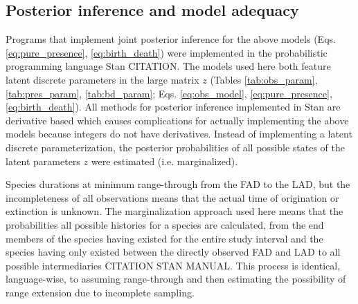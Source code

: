\documentclass[12pt,letterpaper]{article}
\begin{document}
\subsection*{Posterior inference and model adequacy}
Programs that implement joint posterior inference for the above models (Eqs. \ref{eq:pure_presence}, \ref{eq:birth_death}) were implemented in the probabilistic programming language Stan CITATION. The models used here both feature latent discrete parameters in the large matrix \(z\) (Tables \ref{tab:obs_param}, \ref{tab:pres_param}, \ref{tab:bd_param}; Eqs. \ref{eq:obs_model}, \ref{eq:pure_presence}, \ref{eq:birth_death}). All methods for posterior inference implemented in Stan are derivative based which causes complications for actually implementing the above models because integers do not have derivatives. Instead of implementing a latent discrete parameterization, the posterior probabilities of all possible states of the latent parameters \(z\) were estimated (i.e. marginalized). 

Species durations at minimum range-through from the FAD to the LAD, but the incompleteness of all observations means that the actual time of origination or extinction is unknown. The marginalization approach used here means that the probabilities all possible histories for a species are calculated, from the end members of the species having existed for the entire study interval and the species having only existed between the directly observed FAD and LAD to all possible intermediaries CITATION STAN MANUAL. This process is identical, language-wise, to assuming range-through and then estimating the possibility of range extension due to incomplete sampling. %
\end{document}
